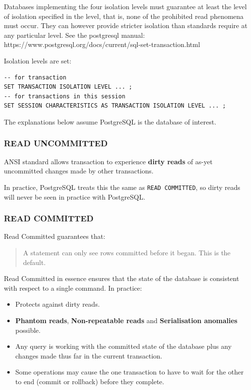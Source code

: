 \documentclass[slides]{pgnotes}
\begin{document}
Databases implementing the four isolation levels must guarantee at least the level of isolation specified in the level, that is, none of the prohibited read phenomena must occur.
They can however provide stricter isolation than standards require at any particular level.
See the postgresql manual:\\
https://www.postgresql.org/docs/current/sql-set-transaction.html

Isolation levels are set:
\begin{verbatim}
-- for transaction 
SET TRANSACTION ISOLATION LEVEL ... ;
-- for transactions in this session
SET SESSION CHARACTERISTICS AS TRANSACTION ISOLATION LEVEL ... ; 
\end{verbatim}
The explanations below assume PostgreSQL is the database of interest.


\subsubsection{READ UNCOMMITTED}

ANSI standard allows transaction to experience \textbf{dirty reads} of as-yet uncommitted changes made by other transactions.

In practice, PostgreSQL treats this the same as \texttt{READ COMMITTED}, so dirty reads will never be seen in practice with PostgreSQL.



\subsubsection{READ COMMITTED}

Read Committed guarantees that:
\begin{quotation}
  A statement can only see rows committed before it began. This is the default.
\end{quotation}
Read Committed in essence ensures that the state of the database is consistent with respect to a single command. 
In practice:
\begin{itemize}
\item Protects against dirty reads.
\item \textbf{Phantom reads}, \textbf{Non-repeatable reads} and \textbf{Serialisation anomalies}  possible.
\item Any query is working with the committed state of the database plus any changes made thus far in the current transaction.
\item Some operations may cause the one transaction to have to wait for the other to end (commit or rollback) before they complete.
\end{itemize}
\end{document}
